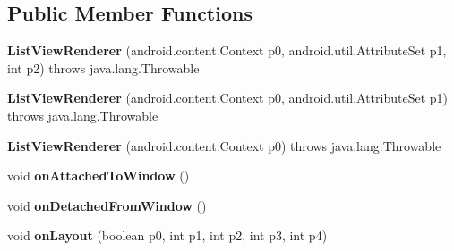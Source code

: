 \subsection*{Public Member Functions}
\begin{DoxyCompactItemize}
\item 
\mbox{\label{classmd5b60ffeb829f638581ab2bb9b1a7f4f3f_1_1ListViewRenderer_add061c8b593d05e8c08a3b32390f1693}} 
{\bfseries List\+View\+Renderer} (android.\+content.\+Context p0, android.\+util.\+Attribute\+Set p1, int p2)  throws java.\+lang.\+Throwable 	
\item 
\mbox{\label{classmd5b60ffeb829f638581ab2bb9b1a7f4f3f_1_1ListViewRenderer_ae63e27dcc4de3ca21c49eba92efaaca0}} 
{\bfseries List\+View\+Renderer} (android.\+content.\+Context p0, android.\+util.\+Attribute\+Set p1)  throws java.\+lang.\+Throwable 	
\item 
\mbox{\label{classmd5b60ffeb829f638581ab2bb9b1a7f4f3f_1_1ListViewRenderer_a94f680200f61591dc6b8b56984ea1db5}} 
{\bfseries List\+View\+Renderer} (android.\+content.\+Context p0)  throws java.\+lang.\+Throwable 	
\item 
\mbox{\label{classmd5b60ffeb829f638581ab2bb9b1a7f4f3f_1_1ListViewRenderer_ae8bbcebd2d1fba70c74cfdf6c44e755d}} 
void {\bfseries on\+Attached\+To\+Window} ()
\item 
\mbox{\label{classmd5b60ffeb829f638581ab2bb9b1a7f4f3f_1_1ListViewRenderer_ad69b0d3bf09e4c1ec70515fab015975e}} 
void {\bfseries on\+Detached\+From\+Window} ()
\item 
\mbox{\label{classmd5b60ffeb829f638581ab2bb9b1a7f4f3f_1_1ListViewRenderer_aaab562eda2712d67615715b8aa3d00c7}} 
void {\bfseries on\+Layout} (boolean p0, int p1, int p2, int p3, int p4)
\item 
\mbox{\label{classmd5b60ffeb829f638581ab2bb9b1a7f4f3f_1_1ListViewRenderer_a8dd7354cec7536410158693968e43b0f}} 

\end{DoxyCompactItemize}
